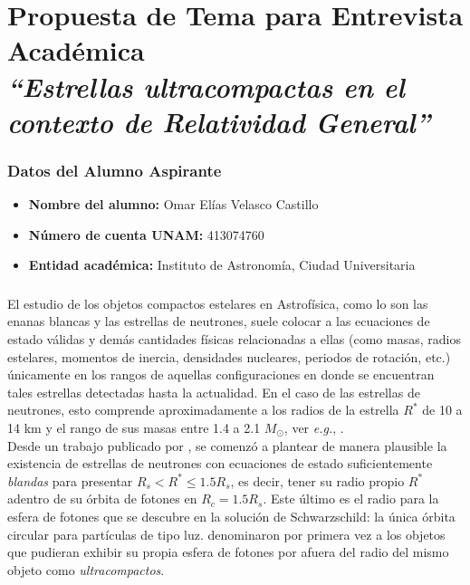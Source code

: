 \documentclass[12pt, letterpaper]{elegantbook}
\begin{document}
\mainmatter


\chapter*{Propuesta de Tema para Entrevista Académica \\ \textit{``Estrellas ultracompactas en el contexto de Relatividad General''}}


\subsection*{Datos del Alumno Aspirante}

\begin{itemize}
\item \textbf{Nombre del alumno:} Omar Elías Velasco Castillo
\item \textbf{Número de cuenta UNAM:} 413074760
\item \textbf{Entidad académica:} Instituto de Astronomía, Ciudad Universitaria
\end{itemize}
\subsection*{}
El estudio de los objetos compactos estelares en Astrofísica, como lo son las enanas blancas y las estrellas de
neutrones, suele colocar a las ecuaciones de estado válidas y demás cantidades físicas relacionadas a ellas (como masas, radios estelares, momentos de inercia, densidades nucleares, periodos de rotación, etc.) únicamente en los rangos de aquellas configuraciones en donde se encuentran tales estrellas detectadas hasta la actualidad. En el caso de las estrellas de neutrones, esto comprende aproximadamente a los radios de la estrella $R^*$
de 10 a 14 km y el rango de sus masas entre 1.4 a 2.1 $M_{\odot}$, ver \textit{e.g.}, \cite{Suleiman:2021hre}.\\

Desde un trabajo publicado por \cite{1975ApJ...199..471H}, se comenzó a plantear de manera plausible la existencia de estrellas de neutrones con ecuaciones de estado suficientemente \textit{blandas} para presentar $R_s<R^*\leq 1.5R_s$, es decir, tener su radio propio $R^*$ adentro de su órbita de fotones en $R_c=1.5R_s$. Este último es el radio para la esfera de fotones que se descubre en la solución de Schwarzschild: la única órbita circular para partículas de tipo luz. \cite{1985CQGra...2..219I} denominaron por primera vez a los objetos que pudieran exhibir su propia esfera de fotones por afuera del radio del mismo objeto como \textit{ultracompactos}.\\
\end{document}
